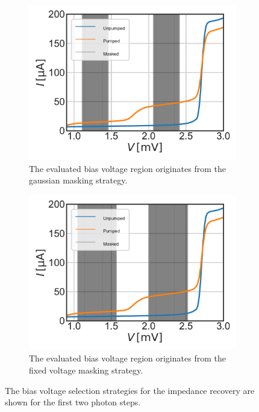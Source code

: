\documentclass[]{article}
\begin{document}
\begin{figure}
	\centering              
	\begin{subfigure}[t]{0.49\textwidth}
		\centering
		\includegraphics[width=\linewidth]{./../Mixer_Unit_Test/2020_01_15_Gaus_Two_Steps/Masked_Voltage_Region_two_Photon_Steps.pdf}
		\caption{The evaluated bias voltage region originates from the gaussian masking strategy.}
	\end{subfigure}
	\begin{subfigure}[t]{0.49\textwidth}
		\centering
		\includegraphics[width=\linewidth]{./../Mixer_Unit_Test/2020_01_15_twoPhotonStepsFixed/Masked_Voltage_Region_two_Photon_Steps.pdf}
		\caption{The evaluated bias voltage region originates from the fixed voltage masking strategy.}
	\end{subfigure}
	\caption[]{The bias voltage selection strategies for the impedance recovery are shown for the first two photon steps.
	}
	\label{fig:Masked_Voltage_Region_two_Photon_Steps}
\end{figure}
\end{document}

